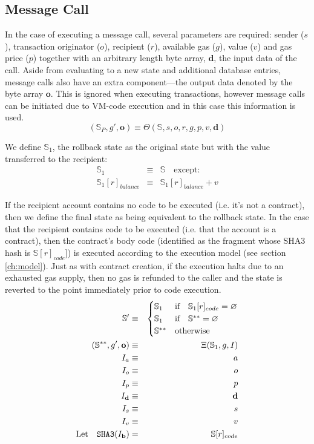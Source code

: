 \documentclass[9pt,oneside]{amsart}
\begin{document}
\begin{multicols}{2}
\section{Message Call} \label{ch:call}

In the case of executing a message call, several parameters are required: sender ($s$), transaction originator ($o$), recipient ($r$), available gas ($g$), value ($v$) and gas price ($p$) together with an arbitrary length byte array, $\mathbf{d}$, the input data of the call. Aside from evaluating to a new state and additional database entries, message calls also have an extra component---the output data denoted by the byte array $\mathbf{o}$. This is ignored when executing transactions, however message calls can be initiated due to VM-code execution and in this case this information is used.
\begin{equation}
(\mathbb{S}_P, g', \mathbf{o}) \equiv \Theta(\mathbb{S}, s, o, r, g, p, v, \mathbf{d})
\end{equation}

We define $\mathbb{S}_1$, the rollback state as the original state but with the value transferred to the recipient:
\begin{eqnarray}
\mathbb{S}_1 & \equiv & \mathbb{S} \quad \text{except:} \\
\mathbb{S}_1[r]_{balance} & \equiv & \mathbb{S}_1[r]_{balance} + v
\end{eqnarray}

If the recipient account contains no code to be executed (i.e. it's not a contract), then we define the final state as being equivalent to the rollback state. In the case that the recipient contains code to be executed (i.e. that the account is a contract), then the contract's body code (identified as the fragment whose SHA3 hash is $\mathbb{S}[r]_{code}]$) is executed according to the execution model (see section \ref{ch:model}). Just as with contract creation, if the execution halts due to an exhausted gas supply, then no gas is refunded to the caller and the state is reverted to the point immediately prior to code execution.
\begin{eqnarray}
\mathbb{S}' & \equiv & \begin{cases}
\mathbb{S}_1 & \text{if} \quad \mathbb{S}_1[r]_{code} = \varnothing \\
\mathbb{S}_1 & \text{if} \quad \mathbb{S}^{**} = \varnothing \\
\mathbb{S}^{**} & \text{otherwise}
\end{cases} \\
(\mathbb{S}^{**}, g', \mathbf{o}) & \equiv & \Xi(\mathbb{S}_1, g, I) \\
I_a & \equiv & a \\
I_o & \equiv & o \\
I_p & \equiv & p \\
I_\mathbf{d} & \equiv & \mathbf{d} \\
I_s & \equiv & s \\
I_v & \equiv & v \\
\text{Let} \quad \mathtt{\tiny SHA3}(I_\mathbf{b}) & = & \mathbb{S}[r]_{code}
\end{eqnarray}


\end{multicols}
\end{document}
